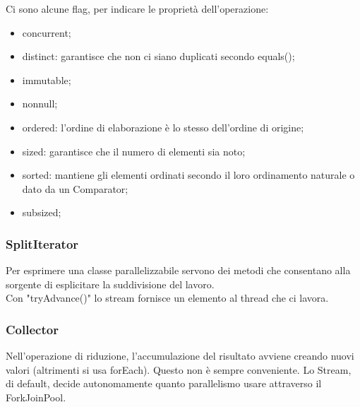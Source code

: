 \documentclass{article}
\begin{document}
Ci sono alcune flag, per indicare le proprietà dell'operazione:
\begin{itemize}
	\item concurrent;

	\item distinct: garantisce che non ci siano duplicati secondo equals();

	\item immutable;

	\item nonnull;

	\item ordered: l'ordine di elaborazione è lo stesso dell'ordine di
		origine;

	\item sized: garantisce che il numero di elementi sia noto;

	\item sorted: mantiene gli elementi ordinati secondo il loro ordinamento
		naturale o dato da un Comparator;

	\item subsized;
\end{itemize}

\subsubsection{SplitIterator}
Per esprimere una classe parallelizzabile servono dei metodi che consentano alla
sorgente di esplicitare la suddivisione del lavoro.\\
Con "tryAdvance()" lo stream fornisce un elemento al thread che ci lavora.

\subsubsection{Collector}

Nell'operazione di riduzione, l'accumulazione del risultato avviene creando
nuovi valori (altrimenti si usa forEach). Questo non è sempre conveniente.
Lo Stream, di default, decide autonomamente quanto parallelismo usare attraverso
il ForkJoinPool.
\end{document}
